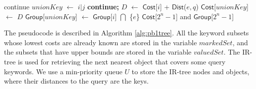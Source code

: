 \documentclass{sig-alternate}
\newcommand{\Dist}{\mbox{$\mathsf{Dist}$}\xspace}
\newcommand{\Cost}{\mbox{$\mathsf{Cost}$}}
\newcommand{\Group}{\mbox{$\mathsf{Group}$}}
\begin{document}
\begin{algorithm}[!h]
{{{{                    {
                        \lIf{\Cost$[i]$ $= \infty $ } { continue}\;
                        $unionKey$ $\leftarrow$ $i | j$\;
                        {\bf continue;}
                        $D$ $\leftarrow$ \Cost[$i$] + \Dist($e, q$)\;
                        \If{\Cost$[$unionKey$]$ $>$ D }
                        {
                            \Cost[$unionKey$] $\leftarrow$ $D$\;
                            \Group[$unionKey$] $\leftarrow$ \Group[$i$] $\bigcap$ \{$\mathit{e}$\}\;
                        }
                    }
                }
            }
        }
    }
\Return \Cost[$2^n-1$] and \Group[$2^n-1$]\;\vspace{-1ex}
\end{algorithm}\vspace{-1ex}

The pseudocode is described in Algorithm \ref{alg:pb1tree}.
%
All the keyword subsets whose lowest costs are already known
are stored in the variable $markedSet$, and the subsets that
have upper bounds are stored in the variable $valuedSet$.
%
The IR-tree is used for retrieving the next nearest object that
covers some query keywords. We use a min-priority queue $U$ to
store the IR-tree nodes and objects, where their distances to the
query are the keys.
\end{document}
